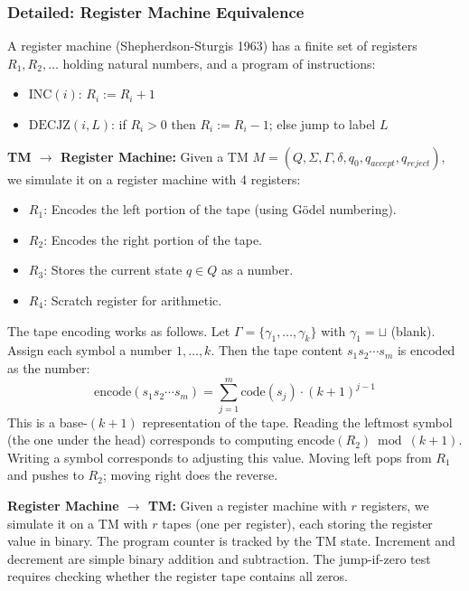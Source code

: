 \subsubsection*{Detailed: Register Machine Equivalence}

A register machine (Shepherdson-Sturgis 1963) has a finite set of registers $R_1, R_2, \dots$ holding natural numbers, and a program of instructions:
\begin{itemize}
\item $\text{INC}(i)$: $R_i := R_i + 1$
\item $\text{DECJZ}(i, L)$: if $R_i > 0$ then $R_i := R_i - 1$; else jump to label $L$
\end{itemize}

\textbf{TM $\to$ Register Machine:} Given a TM $M = (Q, \Sigma, \Gamma, \delta, q_0, q_{accept}, q_{reject})$, we simulate it on a register machine with 4 registers:
\begin{itemize}
\item $R_1$: Encodes the left portion of the tape (using G\"odel numbering).
\item $R_2$: Encodes the right portion of the tape.
\item $R_3$: Stores the current state $q \in Q$ as a number.
\item $R_4$: Scratch register for arithmetic.
\end{itemize}

The tape encoding works as follows. Let $\Gamma = \{\gamma_1, \ldots, \gamma_k\}$ with $\gamma_1 = \sqcup$ (blank). Assign each symbol a number $1,\ldots,k$. Then the tape content $s_1 s_2 \cdots s_m$ is encoded as the number:
\[
\text{encode}(s_1 s_2 \cdots s_m) = \sum_{j=1}^m \text{code}(s_j) \cdot (k+1)^{j-1}
\]
This is a base-$(k+1)$ representation of the tape. Reading the leftmost symbol (the one under the head) corresponds to computing $\text{encode}(R_2) \bmod (k+1)$. Writing a symbol corresponds to adjusting this value. Moving left pops from $R_1$ and pushes to $R_2$; moving right does the reverse.

\textbf{Register Machine $\to$ TM:} Given a register machine with $r$ registers, we simulate it on a TM with $r$ tapes (one per register), each storing the register value in binary. The program counter is tracked by the TM state. Increment and decrement are simple binary addition and subtraction. The jump-if-zero test requires checking whether the register tape contains all zeros.

